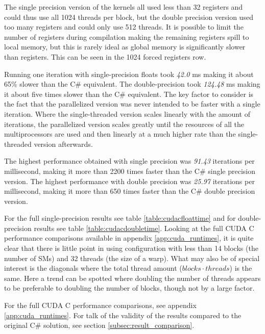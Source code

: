 The single precision version of the kernels all used less than 32 registers and could thus use all 1024 threads per block, but the double precision version used too many registers and could only use 512 threads. 
It is possible to limit the number of registers during compilation making the remaining registers spill to local memory, but this is rarely ideal as global memory is significantly slower than registers.
This can be seen in the 1024 forced registers row.

Running one iteration with single-precision floats took \emph{42.0} ms making it about 65\% slower than the C\# equivalent.
The double-precision took \emph{124.48} ms making it about five times slower than the C\# equivalent.
The key factor to consider is the fact that the parallelized version was never intended to be faster with a single iteration.
Where the single-threaded version scales linearly with the amount of iterations, the parallelized version scales greatly until the resources of all the multiprocessors are used and then linearly at a much higher rate than the single-threaded version afterwards.

The highest performance obtained with single precision was \emph{91.43} iterations per millisecond, making it more than 2200 times faster than the C\# single precision version.
The highest performance with double precision was \emph{25.97} iterations per millisecond, making it more than 650 times faster than the C\# double precision version.

For the full single-precision results see table \ref{table:cudacfloattime} and for double-precision results see table \ref{table:cudacdoubletime}.
Looking at the full CUDA C performance comparisons available in appendix \ref{app:cuda_runtimes}, it is quite clear that there is little point in using configuration with less than 14 blocks (the number of SMs) and 32 threads (the size of a warp).
What may also be of special interest is the diagonals where the total thread amount ($blocks \cdot threads$) is the same.
Here a trend can be spotted where doubling the number of threads appears to be preferable to doubling the number of blocks, though not by a large factor.

For the full CUDA C performance comparisons, see appendix \ref{app:cuda_runtimes}.
For talk of the validity of the results compared to the original C\# solution, see section \ref{subsec:result_comparison}.

